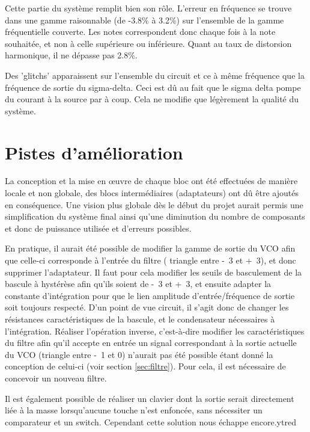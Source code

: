 Cette partie du système remplit bien son rôle. L'erreur en 
fréquence se trouve dans une gamme raisonnable (de -3.8\% à 3.2\%)
sur l'ensemble de la gamme fréquentielle couverte. Les notes 
correspondent donc chaque fois à la note souhaitée, et non à celle
supérieure ou inférieure.
Quant au taux de distorsion harmonique, il ne dépasse pas 2.8\%.

Des 'glitchs' apparaissent sur l'ensemble du circuit et ce à 
même fréquence que la fréquence de sortie du sigma-delta. Ceci est dû au fait que
le sigma delta pompe du courant à la source par à coup. Cela ne modifie
que légèrement la qualité du système.

\section{Pistes d'amélioration}
\label{sec:pistes-amelioration}
La conception et la mise en œuvre de chaque bloc ont été effectuées
de manière locale et non globale, des blocs
intermédiaires (adaptateurs) ont dû être ajoutés en conséquence. Une vision plus
globale dès le début du projet aurait permis une simplification du
système final ainsi qu'une diminution du nombre de composants et
donc de puissance utilisée et d'erreurs possibles.

En pratique, il aurait été possible de modifier la gamme de sortie
du VCO afin que celle-ci corresponde à l'entrée du filtre (
triangle entre \unit{-3}{\volt} et \unit{+3}{\volt}), et donc 
supprimer l'adaptateur. Il faut pour cela modifier les seuils
de basculement de la bascule à hystérèse afin qu'ils soient de
\unit{-3}{\volt} et \unit{+3}{\volt}, et ensuite adapter la
constante d'intégration pour que le lien amplitude d'entrée/fréquence
de sortie soit toujours respecté. D'un point de vue circuit, il s'agit
donc de changer les résistances caractéristiques de la bascule, et le
condensateur nécessaires à l'intégration. Réaliser l'opération inverse,
c'est-à-dire modifier les caractéristiques du filtre afin qu'il accepte
en entrée un signal correspondant à la sortie actuelle du VCO 
(triangle entre \unit{-1}{\volt} et \unit{0}{\volt}) n'aurait pas été 
possible étant donné la conception de celui-ci (voir section \ref{sec:filtre}). 
Pour cela, il est nécessaire de concevoir un nouveau filtre.

Il est également possible de réaliser un clavier dont la sortie serait directement
liée à la masse lorsqu'aucune touche n'est enfoncée, sans nécessiter un comparateur
et un switch. Cependant cette solution nous échappe encore.ytred

